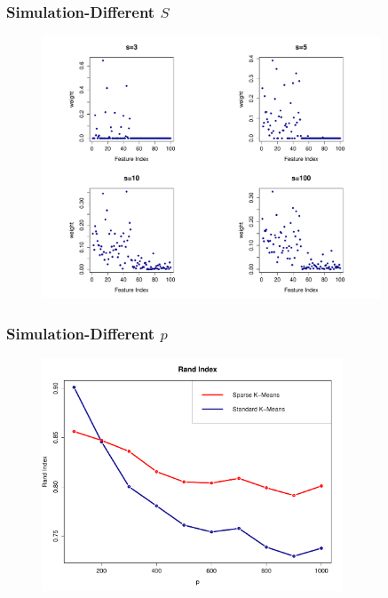 \documentclass{beamer}
\begin{document}
\begin{frame}
\frametitle{Simulation-Different $S$}

\begin{figure}[h!]
  \centering
    \includegraphics[width=0.9\textwidth]{varS.pdf}
\end{figure}
\end{frame}
\begin{frame}
\frametitle{Simulation-Different $p$}
\begin{figure}[h!]
  \centering
    \includegraphics[width=0.8\textwidth]{randIndex.pdf}
\end{figure}
\end{frame}
\end{document}
